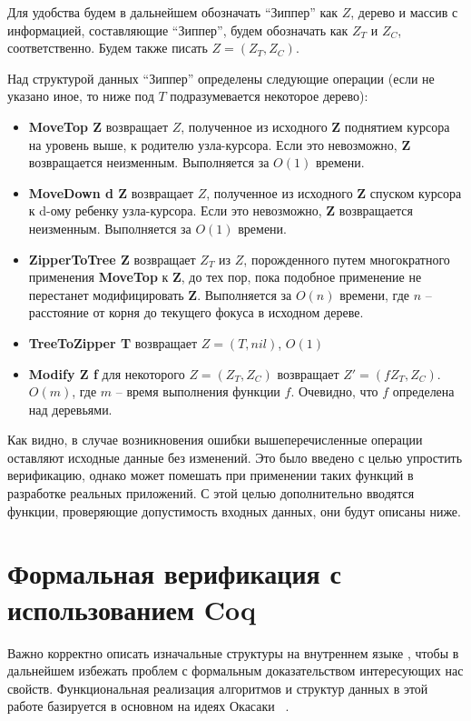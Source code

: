 Для удобства будем в дальнейшем обозначать ``Зиппер'' как $Z$, дерево и массив с информацией, составляющие ``Зиппер'', будем обозначать как $Z_T$ и $Z_C$, соответственно. Будем также писать $Z = (Z_T, Z_C)$.

Над структурой данных ``Зиппер'' определены следующие операции (если не указано иное, то ниже под $T$ подразумевается некоторое дерево):
\begin{itemize}
\item \textbf{MoveTop Z} возвращает $Z$, полученное из исходного \textbf{Z} поднятием курсора на уровень выше, к родителю узла-курсора. Если это невозможно, \textbf{Z} возвращается неизменным. Выполняется за $O(1)$ времени.
\item \textbf{MoveDown d Z} возвращает $Z$, полученное из исходного \textbf{Z} спуском курсора к d-ому ребенку узла-курсора. Если это невозможно, \textbf{Z} возвращается неизменным. Выполняется за $O(1)$ времени.
\item \textbf{ZipperToTree Z} возвращает $Z_T$ из $Z$, порожденного путем многократного применения \textbf{MoveTop} к \textbf{Z}, до тех пор, пока подобное применение не перестанет модифицировать \textbf{Z}. Выполняется за $O(n)$ времени, где $n$ -- расстояние от корня до текущего фокуса в исходном дереве.
\item \textbf{TreeToZipper T} возвращает $Z = (T, nil)$, $O(1)$
\item \textbf{Modify Z f} для некоторого $Z = (Z_T, Z_C)$ возвращает $Z' = (f Z_T, Z_C)$. $O(m)$, где $m$ -- время выполнения функции $f$. Очевидно, что $f$ определена над деревьями.
\end{itemize}

Как видно, в случае возникновения ошибки вышеперечисленные операции оставляют исходные данные без изменений. Это было введено с целью упростить верификацию, однако может помешать при применении таких функций в разработке реальных приложений. С этой целью дополнительно вводятся функции, проверяющие допустимость входных данных, они будут описаны ниже.

\section{Формальная верификация с использованием Coq}

Важно корректно описать изначальные структуры на внутреннем языке \tcoq, чтобы в дальнейшем избежать проблем с формальным доказательством интересующих нас свойств. Функциональная реализация алгоритмов и структур данных в этой работе базируется в основном на идеях Окасаки ~\autocite{Okasaki1996}.

